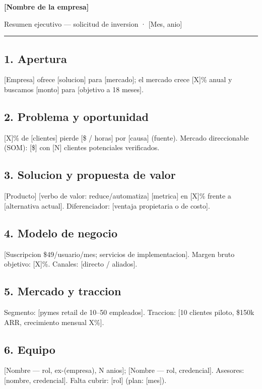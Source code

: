 \documentclass[11pt]{article}
\renewcommand{\tituloProyecto}{[Nombre de la empresa]}
\renewcommand{\subtituloProyecto}{Resumen ejecutivo — solicitud de inversion}
\renewcommand{\fechaProyecto}{[Mes, anio]}
\begin{document}
\begin{center}
  {\large\bfseries\tituloProyecto\par}
  \vspace{2pt}
  {\small\subtituloProyecto{} · \fechaProyecto\par}
  {\color{bftCoral}\rule{0.3\textwidth}{1.5pt}\par}
\end{center}

\subsection*{1. Apertura}
[Empresa] ofrece [solucion] para [mercado]; el mercado crece [X]\% anual y
buscamos [monto] para [objetivo a 18 meses].

\subsection*{2. Problema y oportunidad}
[X]\% de [clientes] pierde [\$ / horas] por [causa] (fuente). Mercado
direccionable (SOM): [\$] con [N] clientes potenciales verificados.

\subsection*{3. Solucion y propuesta de valor}
[Producto] [verbo de valor: reduce/automatiza] [metrica] en [X]\% frente a
[alternativa actual]. Diferenciador: [ventaja propietaria o de costo].

\subsection*{4. Modelo de negocio}
[Suscripcion \$49/usuario/mes; servicios de implementacion]. Margen bruto
objetivo: [X]\%. Canales: [directo / aliados].

\subsection*{5. Mercado y traccion}
Segmento: [pymes retail de 10–50 empleados]. Traccion: [10 clientes piloto,
\$150k ARR, crecimiento mensual X\%].

\subsection*{6. Equipo}
[Nombre — rol, ex-(empresa), N anios]; [Nombre — rol, credencial].
Asesores: [nombre, credencial]. Falta cubrir: [rol] (plan: [mes]).
\end{document}
